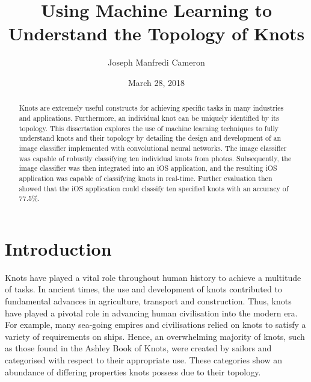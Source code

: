 \documentclass{l4proj}
\begin{document}
\title{Using Machine Learning to Understand the Topology of Knots}
\author{Joseph Manfredi Cameron}
\date{March 28, 2018}
\maketitle

\begin{abstract}
Knots are extremely useful constructs for achieving specific tasks in many industries and applications.
Furthermore, an individual knot can be uniquely identified by its topology.
This dissertation explores the use of machine learning techniques to fully understand knots and their topology by detailing the design and development of an image classifier implemented with convolutional neural networks.
The image classifier was capable of robustly classifying ten individual knots from photos.
Subsequently, the image classifier was then integrated into an iOS application, and the resulting iOS application was capable of classifying knots in real-time.
Further evaluation then showed that the iOS application could classify ten specified knots with an accuracy of 77.5\%.
\end{abstract}

\educationalconsent
%
%
\tableofcontents


\chapter{Introduction}

Knots have played a vital role throughout human history to achieve a multitude of tasks. 
In ancient times, the use and development of knots contributed to fundamental advances in agriculture, transport and construction.
Thus, knots have played a pivotal role in advancing human civilisation into the modern era.
For example, many sea-going empires and civilisations relied on knots to satisfy a variety of requirements on ships.
Hence, an overwhelming majority of knots, such as those found in the Ashley Book of Knots, were created by sailors and categorised with respect to their appropriate use.
These categories show an abundance of differing properties knots possess due to their topology.
 
\end{document}
